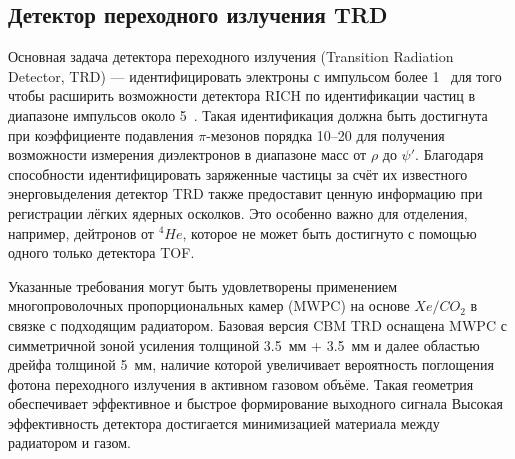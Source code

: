 \subsection{Детектор переходного излучения TRD}\label{sec:secTRD}


Основная задача детектора переходного излучения (Transition Radiation Detector, TRD) --- идентифицировать электроны с импульсом более 1~\GeVoverC{} для того чтобы расширить возможности детектора RICH по идентификации частиц в диапазоне импульсов около 5~\GeVoverC{}.
Такая идентификация должна быть достигнута при коэффициенте подавления $\pi$-мезонов порядка 10--20 для получения возможности измерения диэлектронов в диапазоне масс от $\rho$ до $\psi'$.
Благодаря способности идентифицировать заряженные частицы за счёт их известного энерговыделения детектор TRD также предоставит ценную информацию при регистрации лёгких ядерных осколков.
Это особенно важно для отделения, например, дейтронов от $ ^{4}He $, которое не может быть достигнуто с помощью одного только детектора TOF.


Указанные требования могут быть удовлетворены применением многопроволочных пропорциональных камер (MWPC) на основе $ Xe/CO_{2} $ в связке с подходящим радиатором. Базовая версия CBM TRD оснащена MWPC с симметричной зоной усиления толщиной 3.5~мм + 3.5~мм и далее областью дрейфа толщиной 5~мм, наличие которой увеличивает вероятность поглощения фотона переходного излучения в активном газовом объёме. Такая геометрия обеспечивает эффективное и быстрое формирование выходного сигнала
Высокая эффективность детектора достигается минимизацией материала между радиатором и газом.

